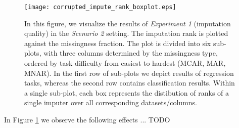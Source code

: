 \begin{figure}\centering
    \texttt{[image: corrupted\_impute\_rank\_boxplot.eps]}

    \caption[Scenario 2 Imputation Ranks]{In this figure, we visualize the results of \textit{Experiment 1} (imputation quality) in the \textit{Scenario 2} setting. The imputation rank is plotted against the missingness fraction. The plot is divided into six sub-plots, with three columns determined by the missingness type, ordered by task difficulty from easiest to hardest (MCAR, MAR, MNAR). In the first row of sub-plots we depict results of regression tasks, whereas the second row contains classification results. Within a single sub-plot, each box represents the distibution of ranks of a single imputer over all corresponding datasets/columns.
    }
	\label{fig:corrupted_impute_rank_boxplot}
\end{figure}

In Figure \ref{fig:corrupted_impute_rank_boxplot} we observe the following effects ...
TODO
